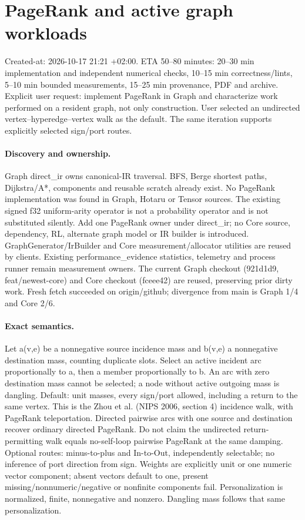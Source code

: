 \documentclass[11pt]{article}
\begin{document}
\newpage\section*{PageRank and active graph workloads}
Created-at: 2026-10-17 21:21 +02:00. ETA 50--80 minutes: 20--30 min implementation
and independent numerical checks, 10--15 min correctness/lints, 5--10 min bounded
measurements, 15--25 min provenance, PDF and archive. Explicit user request:
implement PageRank in Graph and characterize work performed on a resident graph,
not only construction. User selected an undirected vertex--hyperedge--vertex walk
as the default. The same iteration supports explicitly selected sign/port routes.

\paragraph{Discovery and ownership.} Graph direct\_ir owns canonical-IR traversal.
BFS, Berge shortest paths, Dijkstra/A*, components and reusable scratch already
exist. No PageRank implementation was found in Graph, Hotaru or Tensor sources.
The existing signed f32 uniform-arity operator is not a probability operator and
is not substituted silently. Add one PageRank owner under direct\_ir; no Core
source, dependency, RL, alternate graph model or IR builder is introduced.
GraphGenerator/IrBuilder and Core measurement/allocator utilities are reused by
clients. Existing performance\_evidence statistics, telemetry and process runner
remain measurement owners. The current Graph checkout (921d1d9, feat/newest-core)
and Core checkout (fceee42) are reused, preserving prior dirty work. Fresh fetch
succeeded on origin/github; divergence from main is Graph 1/4 and Core 2/6.

\paragraph{Exact semantics.} Let a(v,e) be a nonnegative source incidence mass and
b(v,e) a nonnegative destination mass, counting duplicate slots. Select an active
incident arc proportionally to a, then a member proportionally to b. An arc with
zero destination mass cannot be selected; a node without active outgoing mass is
dangling. Default: unit masses, every sign/port allowed, including a return to the
same vertex. This is the Zhou et al. (NIPS 2006, section 4) incidence walk, with
PageRank teleportation. Directed pairwise arcs with one source and destination
recover ordinary directed PageRank. Do not claim the undirected return-permitting
walk equals no-self-loop pairwise PageRank at the same damping.
Optional routes: minus-to-plus and In-to-Out, independently selectable; no inference
of port direction from sign. Weights are explicitly unit or one numeric vector
component; absent vectors default to one, present missing/nonnumeric/negative or
nonfinite components fail. Personalization is normalized, finite, nonnegative and
nonzero. Dangling mass follows that same personalization.
\end{document}
